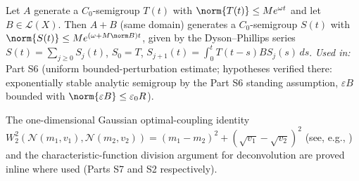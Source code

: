 \begin{proposition}\label{imp:bpt}
Let $A$ generate a $C_0$-semigroup $T(t)$ with $\norm{T(t)}\le Me^{\omega t}$
and let $B\in\mathcal L(X)$. Then $A+B$ (same domain) generates a
$C_0$-semigroup $S(t)$ with $\norm{S(t)}\le Me^{(\omega+M\norm B)t}$, given
by the Dyson--Phillips series
$S(t)=\sum_{j\ge0}S_j(t)$, $S_0=T$,
$S_{j+1}(t)=\int_0^tT(t-s)BS_j(s)\,ds$.
\emph{Used in:} Part S6 (uniform bounded-perturbation estimate; hypotheses
verified there: exponentially stable analytic semigroup by the Part S6
standing assumption, $\varepsilon B$ bounded with
$\norm{\varepsilon B}\le\varepsilon_0R$).
\end{proposition}

\begin{remark}
The one-dimensional Gaussian optimal-coupling identity
$W_2^2(\mathcal N(m_1,v_1),\mathcal N(m_2,v_2))
=(m_1-m_2)^2+(\sqrt{v_1}-\sqrt{v_2})^2$ (see, e.g.,
\citealp[Chapter~6]{Villani2009}) and the characteristic-function
division argument for deconvolution are proved inline where used
(Parts S7 and S2 respectively).
\end{remark}

